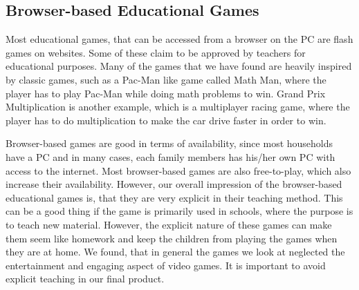 
\subsection{Browser-based Educational Games}
Most educational games, that can be accessed from a browser on the PC are flash games on websites.
Some of these claim to be approved by teachers for educational purposes.
Many of the games that we have found are heavily inspired by classic games, such as a Pac-Man like game called Math Man, where the player has to play Pac-Man while doing math problems to win.\cite{mathman}
Grand Prix Multiplication is another example, which is a multiplayer racing game, where the player has to do multiplication to make the car drive faster in order to win.\cite{grandprix}\newline

Browser-based games are good in terms of availability, since most households have a PC and in many cases, each family members has his/her own PC with access to the internet. Most browser-based games are also free-to-play, which also increase their availability. However, our overall impression of the browser-based educational games is, that they are very explicit in their teaching method. This can be a good thing if the game is primarily used in schools, where the purpose is to teach new material. However, the explicit nature of these games can make them seem like homework and keep the children from playing the games when they are at home. We found, that in general the games we look at neglected the entertainment and engaging aspect of video games. It is important to avoid explicit teaching in our final product.